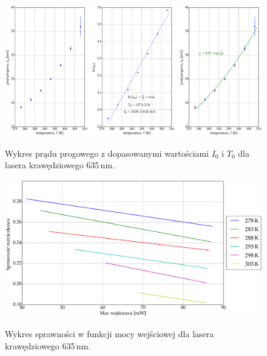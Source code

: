 \begin{figure}
\center
  \includegraphics[scale=0.30]{plot635/plot_fit.eps}
  \label{rys2}
  \caption{Wykres prądu progowego z dopasowanymi wartościami $I_{0}$ i $T_{0}$ dla lasera krawędziowego 635\,nm.}
\end{figure}
\begin{figure}
\center
  \includegraphics[scale=0.30]{plot635/plot_eff_via_power.eps}
  \label{rys3}
  \caption{Wykres sprawności w funkcji mocy wejściowej dla lasera krawędziowego 635\,nm.}
\end{figure}
